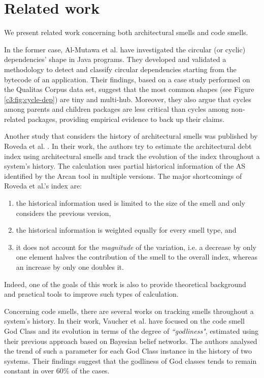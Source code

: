 \section{Related work}\label{c3:sec:related-work}
We present related work concerning both architectural smells and code smells.

In the former case, Al-Mutawa et al. \cite{AlMutawa2014} have investigated the circular (or cyclic) dependencies' shape in Java programs. 
They developed and validated a methodology to detect and classify circular dependencies starting from the bytecode of an application.
Their findings, based on a case study performed on the Qualitas Corpus \cite{QualitasCorpus2010} data set, suggest that the most common shapes (see Figure \ref{c3:fig:cycle-dep}) are tiny and multi-hub. Moreover, they also argue that cycles among parents and children packages are less critical than cycles among non-related packages, providing empirical evidence to back up their claims.

Another study that considers the history of architectural smells was published by Roveda et al. \cite{Roveda2018}.
In their work, the authors try to estimate the architectural debt index using architectural smells and track the evolution of the index throughout a system's history.
The calculation uses partial historical information of the AS identified by the Arcan tool in multiple versions.
The major shortcomings of Roveda et al.'s index are:
\begin{enumerate}[label=(\roman*)]
    \item the historical information used is limited to the size of the smell and only considers the previous version,
    \item the historical information is weighted equally for every smell type, and
    \item it does not account for the \emph{magnitude} of the variation, i.e. a decrease by only one element halves the contribution of the smell to the overall index, whereas an increase by only one doubles it.
\end{enumerate}
Indeed, one of the goals of this work is also to provide theoretical background and practical tools to improve such types of calculation.

Concerning code smells, there are several works on tracking smells throughout a system's history.
In their work, Vaucher et al. \cite{Vaucher2009} have focused on the code smell God Class and its evolution in terms of the degree of \textit{``godliness"}, estimated using their previous approach based on Bayesian belief networks.
The authors analysed the trend of such a parameter for each God Class instance in the history of two systems. Their findings suggest that the godliness of God classes tends to remain constant in over 60\% of the cases.


